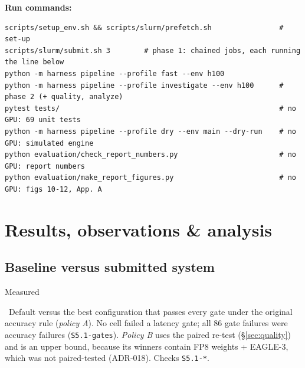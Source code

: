 \documentclass[10pt,a4paper]{article}
\newcommand{\tagbox}[2]{\colorbox{#1}{\ttfamily\scriptsize\bfseries\color{ink}\strut #2}}
\newcommand{\meas}{\tagbox{measbg}{Measured}~}
\begin{document}
\textbf{Run commands:}
\begin{codebox}
\footnotesize
\begin{verbatim}
scripts/setup_env.sh && scripts/slurm/prefetch.sh                # set-up
scripts/slurm/submit.sh 3        # phase 1: chained jobs, each running the line below
python -m harness pipeline --profile fast --env h100
python -m harness pipeline --profile investigate --env h100      # phase 2 (+ quality, analyze)
pytest tests/                                                    # no GPU: 69 unit tests
python -m harness pipeline --profile dry --env main --dry-run    # no GPU: simulated engine
python evaluation/check_report_numbers.py                        # no GPU: report numbers
python evaluation/make_report_figures.py                         # no GPU: figs 10-12, App. A
\end{verbatim}
\end{codebox}

\section{Results, observations \& analysis}
\subsection{Baseline versus submitted system}
\meas Default versus the best configuration that passes every gate under the original accuracy rule (\emph{policy
A}). No cell failed a latency gate; all 86 gate failures were accuracy failures (\texttt{S5.1-gates}).
\emph{Policy B} uses the paired re-test (\S\ref{sec:quality}) and is an upper bound, because its winners contain
FP8 weights + EAGLE-3, which was not paired-tested (ADR-018). Checks \texttt{S5.1-*}.
\end{document}
